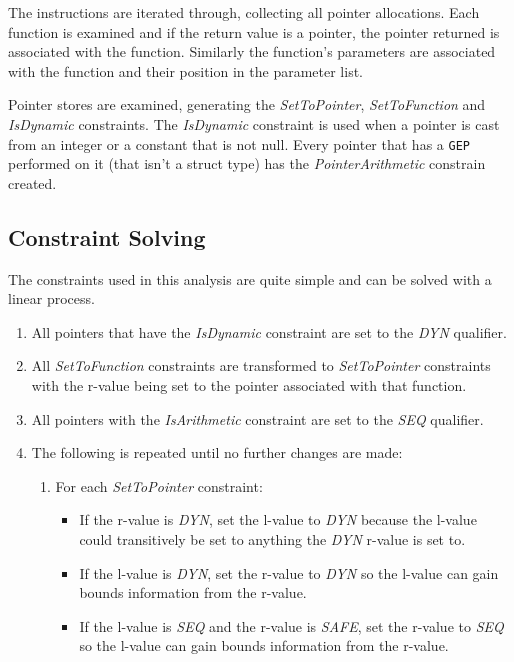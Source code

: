 The instructions are iterated through, collecting all pointer allocations.
Each function is examined and if the return value is a pointer, the pointer returned is associated with the function.
Similarly the function's parameters are associated with the function and their position in the parameter list.

Pointer stores are examined, generating the \textit{SetToPointer}, \textit{SetToFunction} and \textit{IsDynamic} constraints.
The \textit{IsDynamic} constraint is used when a pointer is cast from an integer or a constant that is not null.
Every pointer that has a \verb!GEP! performed on it (that isn't a struct type) has the \textit{PointerArithmetic} constrain created.

\subsection{Constraint Solving}

The constraints used in this analysis are quite simple and can be solved with a linear process.

\begin{enumerate}
\item All pointers that have the \textit{IsDynamic} constraint are set to the \textit{DYN} qualifier.
\item All \textit{SetToFunction} constraints are transformed to \textit{SetToPointer} constraints with the r-value being set to the pointer associated with that function.
\item All pointers with the \textit{IsArithmetic} constraint are set to the \textit{SEQ} qualifier.
\item The following is repeated until no further changes are made:
    \begin{enumerate}
        \item For each \textit{SetToPointer} constraint:
        \begin{itemize}
            \item If the r-value is \textit{DYN}, set the l-value to \textit{DYN} because the l-value could transitively be set to anything the \textit{DYN} r-value is set to.
            \item If the l-value is \textit{DYN}, set the r-value to \textit{DYN} so the l-value can gain bounds information from the r-value.
            \item If the l-value is \textit{SEQ} and the r-value is \textit{SAFE}, set the r-value to \textit{SEQ} so the l-value can gain bounds information from the r-value.
        \end{itemize}
    \end{enumerate}
\end{enumerate}

